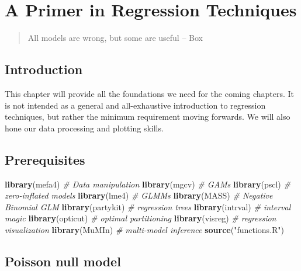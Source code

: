 \documentclass[12pt,]{book}
\newenvironment{Shaded}{\begin{snugshade}}{\end{snugshade}}
\newcommand{\CommentTok}[1]{\textcolor[rgb]{0.56,0.35,0.01}{\textit{#1}}}
\newcommand{\KeywordTok}[1]{\textcolor[rgb]{0.13,0.29,0.53}{\textbf{#1}}}
\newcommand{\NormalTok}[1]{#1}
\newcommand{\StringTok}[1]{\textcolor[rgb]{0.31,0.60,0.02}{#1}}
\begin{document}
\hypertarget{regression}{%
\chapter{A Primer in Regression Techniques}\label{regression}}

\begin{quote}
All models are wrong, but some are useful -- Box
\end{quote}

\hypertarget{introduction}{%
\section{Introduction}\label{introduction}}

This chapter will provide all the foundations we need for the coming chapters.
It is not intended as a general and all-exhaustive introduction to
regression techniques, but rather the minimum requirement moving forwards.
We will also hone our data processing and plotting skills.

\hypertarget{prerequisites}{%
\section{Prerequisites}\label{prerequisites}}

\begin{Shaded}
\begin{Highlighting}[]
\KeywordTok{library}\NormalTok{(mefa4)    }\CommentTok{# Data manipulation}
\KeywordTok{library}\NormalTok{(mgcv)     }\CommentTok{# GAMs}
\KeywordTok{library}\NormalTok{(pscl)     }\CommentTok{# zero-inflated models}
\KeywordTok{library}\NormalTok{(lme4)     }\CommentTok{# GLMMs}
\KeywordTok{library}\NormalTok{(MASS)     }\CommentTok{# Negative Binomial GLM}
\KeywordTok{library}\NormalTok{(partykit) }\CommentTok{# regression trees}
\KeywordTok{library}\NormalTok{(intrval)  }\CommentTok{# interval magic}
\KeywordTok{library}\NormalTok{(opticut)  }\CommentTok{# optimal partitioning}
\KeywordTok{library}\NormalTok{(visreg)   }\CommentTok{# regression visualization}
\KeywordTok{library}\NormalTok{(MuMIn)    }\CommentTok{# multi-model inference}
\KeywordTok{source}\NormalTok{(}\StringTok{"functions.R"}\NormalTok{)}
\end{Highlighting}
\end{Shaded}

\hypertarget{poisson-null-model}{%
\section{Poisson null model}\label{poisson-null-model}}
\end{document}
